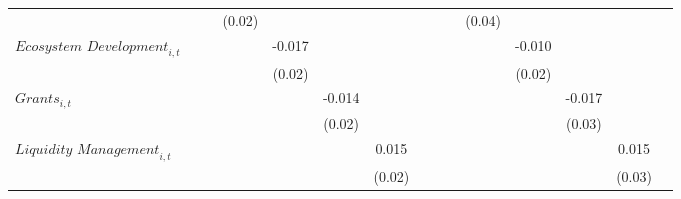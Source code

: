 {\begin{tabular}{l*{14}{c}}
                    &                     &                     &      (0.02)         &                     &                     &                     &                     &                     &                     &      (0.04)         &                     &                     &                     &                     \\
$\textit{Ecosystem Development}_{i,t}$&                     &                     &                     &      -0.017         &                     &                     &                     &                     &                     &                     &      -0.010         &                     &                     &                     \\
                    &                     &                     &                     &      (0.02)         &                     &                     &                     &                     &                     &                     &      (0.02)         &                     &                     &                     \\
$\textit{Grants}_{i,t}$&                     &                     &                     &                     &      -0.014         &                     &                     &                     &                     &                     &                     &      -0.017         &                     &                     \\
                    &                     &                     &                     &                     &      (0.02)         &                     &                     &                     &                     &                     &                     &      (0.03)         &                     &                     \\
$\textit{Liquidity Management}_{i,t}$&                     &                     &                     &                     &                     &       0.015         &                     &                     &                     &                     &                     &                     &       0.015         &                     \\
                    &                     &                     &                     &                     &                     &      (0.02)         &                     &                     &                     &                     &                     &                     &      (0.03)         &                     \\

\end{tabular}}
